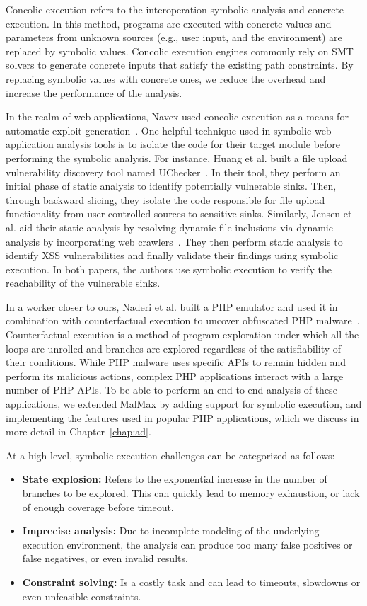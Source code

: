 Concolic execution refers to the interoperation symbolic analysis and concrete execution. 
In this method, programs are executed with concrete values and parameters from unknown sources (e.g., user input, and the environment) are replaced by symbolic values. 
Concolic execution engines commonly rely on SMT solvers to generate concrete inputs that satisfy the existing path constraints. 
By replacing symbolic values with concrete ones, we reduce the overhead and increase the performance of the analysis. 

In the realm of web applications, Navex used concolic execution as a means for automatic exploit generation~\cite{alhuzali2018navex}. 
One helpful technique used in symbolic web application analysis tools is to isolate the code for their target module before performing the symbolic analysis. 
For instance, Huang et al. built a file upload vulnerability discovery tool named UChecker~\cite{Huang2019}. 
In their tool, they perform an initial phase of static analysis to identify potentially vulnerable sinks. 
Then, through backward slicing, they isolate the code responsible for file upload functionality from user controlled sources to sensitive sinks. 
Similarly, Jensen et al. aid their static analysis by resolving dynamic file inclusions via dynamic analysis by incorporating web crawlers~\cite{jensen2012thaps}. 
They then perform static analysis to identify XSS vulnerabilities and finally validate their findings using symbolic execution. 
In both papers, the authors use symbolic execution to verify the reachability of the vulnerable sinks. 

In a worker closer to ours, Naderi et al. built a PHP emulator and used it in combination with counterfactual execution to uncover obfuscated PHP malware~\cite{naderi2019cubismo,naderi2019malmax}. 
Counterfactual execution is a method of program exploration under which all the loops are unrolled and branches are explored regardless of the satisfiability of their conditions. 
While PHP malware uses specific APIs to remain hidden and perform its malicious actions, complex PHP applications interact with a large number of PHP APIs. 
To be able to perform an end-to-end analysis of these applications, we extended MalMax by adding support for symbolic execution, and implementing the features used in popular PHP applications, which we discuss in more detail in Chapter~\ref{chap:ad}. 

At a high level, symbolic execution challenges can be categorized as follows:

\begin{itemize}
    \item \textbf{State explosion:} Refers to the exponential increase in the number of branches to be explored. This can quickly lead to memory exhaustion, or lack of enough coverage before timeout.
    \item \textbf{Imprecise analysis:} Due to incomplete modeling of the underlying execution environment, the analysis can produce too many false positives or false negatives, or even invalid results. 
    \item \textbf{Constraint solving:} Is a costly task and can lead to timeouts, slowdowns or even unfeasible constraints.
\end{itemize}

